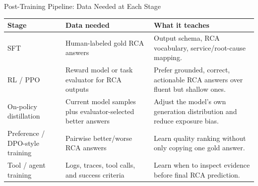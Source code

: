 \begin{frame}{Post-Training Pipeline: Data Needed at Each Stage}
  \scriptsize
  \begin{table}
    \begin{tabular}{p{}p{}p{}}
      \toprule
      Stage & Data needed & What it teaches \\
      \midrule
      SFT & Human-labeled gold RCA answers & Output schema, RCA vocabulary, service/root-cause mapping. \\
      RL / PPO & Reward model or task evaluator for RCA outputs & Prefer grounded, correct, actionable RCA answers over fluent but shallow ones. \\
      On-policy distillation & Current model samples plus evaluator-selected better answers & Adjust the model's own generation distribution and reduce exposure bias. \\
      Preference / DPO-style training & Pairwise better/worse RCA answers & Learn quality ranking without only copying one gold answer. \\
      Tool / agent training & Logs, traces, tool calls, and success criteria & Learn when to inspect evidence before final RCA prediction. \\
      \bottomrule
    \end{tabular}
  \end{table}
\end{frame}


